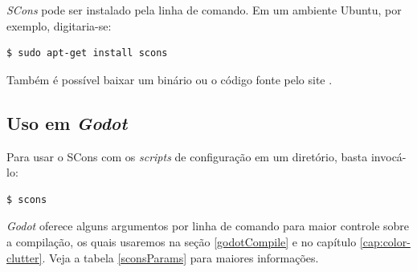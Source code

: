 \textit{SCons} pode ser instalado pela linha de comando. Em um ambiente Ubuntu, por exemplo, digitaria-se:

\begin{lstlisting}[language=Bash]
$ sudo apt-get install scons
\end{lstlisting}

Também é possível baixar um binário ou o código fonte pelo site \citep{sconsDownload}.


\subsection{Uso em \textit{Godot}}

Para usar o SCons com os \textit{scripts} de configuração em um diretório, basta invocá-lo:

\begin{lstlisting}[language=Bash]
$ scons
\end{lstlisting}

\textit{Godot} oferece alguns argumentos por linha de comando para maior controle sobre a compilação, os quais usaremos na seção \ref{godotCompile} e no capítulo \ref{cap:color-clutter}. Veja a tabela \ref{sconsParams} para maiores informações.

